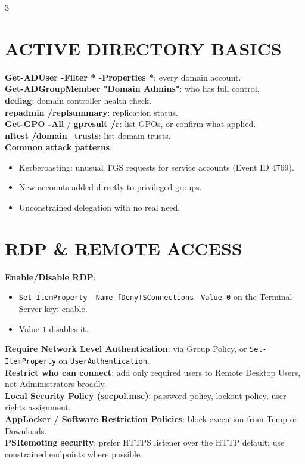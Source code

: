 \documentclass[7pt,landscape]{article}
\begin{document}
\begin{multicols*}{3}
\section{ACTIVE DIRECTORY BASICS}
\textbf{Get-ADUser -Filter * -Properties *}: every domain account. \\
\textbf{Get-ADGroupMember "Domain Admins"}: who has full control. \\
\textbf{dcdiag}: domain controller health check. \\
\textbf{repadmin /replsummary}: replication status. \\
\textbf{Get-GPO -All} / \textbf{gpresult /r}: list GPOs, or confirm what applied. \\
\textbf{nltest /domain\_trusts}: list domain trusts. \\
\textbf{Common attack patterns}:
\begin{itemize}
    \item Kerberoasting: unusual TGS requests for service accounts (Event ID 4769).
    \item New accounts added directly to privileged groups.
    \item Unconstrained delegation with no real need.
\end{itemize}

\section{RDP \& REMOTE ACCESS}
\textbf{Enable/Disable RDP}:
\begin{itemize}
    \item \texttt{Set-ItemProperty -Name fDenyTSConnections} \newline \texttt{-Value 0} on the Terminal Server key: enable.
    \item Value \texttt{1} disables it.
\end{itemize}
\textbf{Require Network Level Authentication}: via Group Policy, or \texttt{Set-ItemProperty} on \texttt{UserAuthentication}. \\
\textbf{Restrict who can connect}: add only required users to Remote Desktop Users, not Administrators broadly. \\
\textbf{Local Security Policy (secpol.msc)}: password policy, lockout policy, user rights assignment. \\
\textbf{AppLocker / Software Restriction Policies}: block execution from Temp or Downloads. \\
\textbf{PSRemoting security}: prefer HTTPS listener over the HTTP default; use constrained endpoints where possible.

\end{multicols*}
\end{document}
